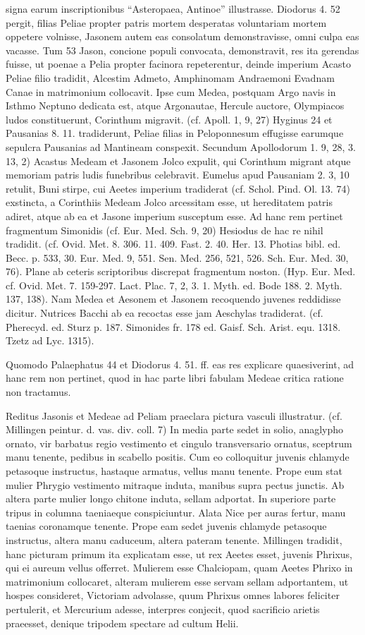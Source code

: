 \documentclass[landscape, a4paper, 11pt, oneside, polutonikogreek, german]{article}
\begin{document}
signa earum inscriptionibus "`Asteropaea, Antinoe"' illustrasse. Diodorus 4. 52 pergit, filias Peliae propter patris mortem desperatas voluntariam mortem oppetere volnisse, Jasonem autem eas consolatum demonstravisse, omni culpa eas vacasse. Tum 53 Jason, concione populi convocata, demonstravit, res ita gerendas fuisse, ut poenae a Pelia propter facinora repeterentur, deinde imperium Acasto Peliae filio tradidit, Alcestim Admeto, Amphinomam Andraemoni Evadnam Canae in matrimonium collocavit. Ipse cum Medea, postquam Argo navis in Isthmo Neptuno dedicata est, atque Argonautae, Hercule auctore, Olympiacos ludos constituerunt, Corinthum migravit. (cf. Apoll. 1, 9, 27) Hyginus 24 et Pausanias 8. 11. tradiderunt, Peliae filias in Peloponnesum effugisse earumque sepulcra Pausanias ad Mantineam conspexit. Secundum Apollodorum 1. 9, 28, 3. 13, 2) Acastus Medeam et Jasonem Jolco expulit, qui Corinthum migrant atque memoriam patris ludis funebribus celebravit. Eumelus apud Pausaniam 2. 3, 10 retulit, Buni stirpe, cui Aeetes imperium tradiderat (cf. Schol. Pind. Ol. 13. 74) exstincta, a Corinthiis Medeam Jolco arcessitam esse, ut hereditatem patris adiret, atque ab ea et Jasone imperium susceptum esse. Ad hanc rem pertinet fragmentum Simonidis (cf. Eur. Med. Sch. 9, 20) Hesiodus de hac re nihil tradidit. (cf. Ovid. Met. 8. 306. 11. 409. Fast. 2. 40. Her. 13. Photias bibl. ed. Becc. p. 533, 30. Eur. Med. 9, 551. Sen. Med. 256, 521, 526. Sch. Eur. Med. 30, 76). Plane ab ceteris scriptoribus discrepat fragmentum noston. (Hyp. Eur. Med. cf. Ovid. Met. 7. 159-297. Lact. Plac. 7, 2, 3. 1. Myth. ed. Bode 188. 2. Myth. 137, 138). Nam Medea et Aesonem et Jasonem recoquendo juvenes reddidisse dicitur. Nutrices Bacchi ab ea recoctas esse jam Aeschylas tradiderat. (cf. Pherecyd. ed. Sturz p. 187. Simonides fr. 178 ed. Gaisf. Sch. Arist. equ. 1318. Tzetz ad Lyc. 1315).

Quomodo Palaephatus 44 et Diodorus 4. 51. ff. eas res explicare quaesiverint, ad hanc rem non pertinet, quod in hac parte libri fabulam Medeae critica ratione non tractamus.

Reditus Jasonis et Medeae ad Peliam praeclara pictura vasculi illustratur. (cf. Millingen peintur. d. vas. div. coll. 7) In media parte sedet in solio, anaglypho ornato, vir barbatus regio vestimento et cingulo transversario ornatus, sceptrum manu tenente, pedibus in scabello positis. Cum eo colloquitur juvenis chlamyde petasoque instructus, hastaque armatus, vellus manu tenente. Prope eum stat mulier Phrygio vestimento mitraque induta, manibus supra pectus junctis. Ab altera parte mulier longo chitone induta, sellam adportat. In superiore parte tripus in columna taeniaeque conspiciuntur. Alata Nice per auras fertur, manu taenias coronamque tenente. Prope eam sedet juvenis chlamyde petasoque instructus, altera manu caduceum, altera pateram tenente. Millingen tradidit, hanc picturam primum ita explicatam esse, ut rex Aeetes esset, juvenis Phrixus, qui ei aureum vellus offerret. Mulierem esse Chalciopam, quam Aeetes Phrixo in matrimonium collocaret, alteram mulierem esse servam sellam adportantem, ut hospes consideret, Victoriam advolasse, quum Phrixus omnes labores feliciter pertulerit, et Mercurium adesse, interpres conjecit, quod sacrificio arietis praeesset, denique tripodem spectare ad cultum Helii.
\end{document}
